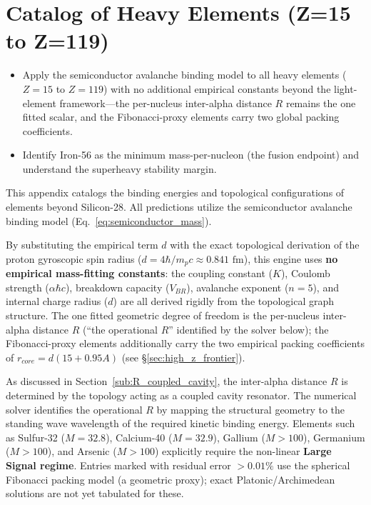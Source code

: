 \chapter{Catalog of Heavy Elements (Z=15 to Z=119)}
\label{ch:heavy_element_catalog}


\begin{objectivebox}
\begin{itemize}
    \item Apply the semiconductor avalanche binding model to all heavy elements ($Z = 15$ to $Z = 119$) with no additional empirical constants beyond the light-element framework---the per-nucleus inter-alpha distance $R$ remains the one fitted scalar, and the Fibonacci-proxy elements carry two global packing coefficients.
    \item Identify Iron-56 as the minimum mass-per-nucleon (the fusion endpoint) and understand the superheavy stability margin.
\end{itemize}
\end{objectivebox}

This appendix catalogs the binding energies and topological configurations of elements beyond Silicon-28. All predictions utilize the semiconductor avalanche binding model (Eq.~\ref{eq:semiconductor_mass}).

By substituting the empirical term $d$ with the exact topological derivation of the proton gyroscopic spin radius ($d = 4\hbar/m_pc \approx 0.841\text{ fm}$), this engine uses \textbf{no empirical mass-fitting constants}: the coupling constant ($K$), Coulomb strength ($\alpha\hbar c$), breakdown capacity ($V_{BR}$), avalanche exponent ($n=5$), and internal charge radius ($d$) are all derived rigidly from the topological graph structure. The one fitted geometric degree of freedom is the per-nucleus inter-alpha distance $R$ (``the operational $R$'' identified by the solver below); the Fibonacci-proxy elements additionally carry the two empirical packing coefficients of $r_{core}=d(15+0.95A)$ (see \S\ref{sec:high_z_frontier}).

As discussed in Section~\ref{sub:R_coupled_cavity}, the inter-alpha distance $R$ is determined by the topology acting as a coupled cavity resonator. The numerical solver identifies the operational $R$ by mapping the structural geometry to the standing wave wavelength of the required kinetic binding energy. Elements such as Sulfur-32 ($M = 32.8$), Calcium-40 ($M = 32.9$), Gallium ($M > 100$), Germanium ($M > 100$), and Arsenic ($M > 100$) explicitly require the non-linear \textbf{Large Signal regime}. Entries marked with residual error $> 0.01\%$ use the spherical Fibonacci packing model (a geometric proxy); exact Platonic/Archimedean solutions are not yet tabulated for these.

